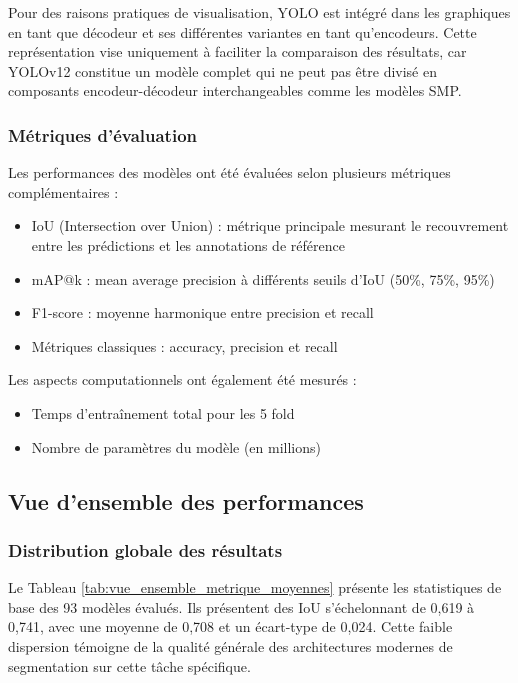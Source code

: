 Pour des raisons pratiques de visualisation, YOLO est intégré dans les graphiques en tant que décodeur et ses différentes variantes en tant qu'encodeurs. Cette représentation vise uniquement à faciliter la comparaison des résultats, car YOLOv12 constitue un modèle complet qui ne peut pas être divisé en composants encodeur-décodeur interchangeables comme les modèles SMP.

\subsubsection{Métriques d'évaluation}

Les performances des modèles ont été évaluées selon plusieurs métriques complémentaires :

\begin{itemize}
    \item IoU (Intersection over Union) : métrique principale mesurant le recouvrement entre les prédictions et les annotations de référence
    \item mAP@k : mean average precision à différents seuils d'IoU (50\%, 75\%, 95\%)
    \item F1-score : moyenne harmonique entre precision et recall
    \item Métriques classiques : accuracy, precision et recall
\end{itemize}

Les aspects computationnels ont également été mesurés :
\begin{itemize}
    \item Temps d'entraînement total pour les 5 fold
    \item Nombre de paramètres du modèle (en millions)
\end{itemize}

\subsection{Vue d'ensemble des performances}

\subsubsection{Distribution globale des résultats}

Le Tableau \ref{tab:vue_ensemble_metrique_moyennes} présente les statistiques de base des 93 modèles évalués. Ils présentent des IoU s'échelonnant de 0,619 à 0,741, avec une moyenne de 0,708 et un écart-type de 0,024. Cette faible dispersion témoigne de la qualité générale des architectures modernes de segmentation sur cette tâche spécifique.


